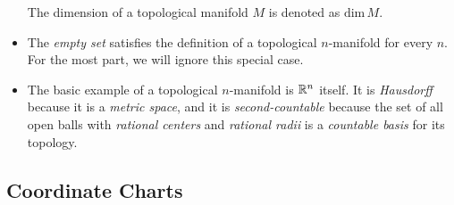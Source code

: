 \documentclass[11pt]{article}
\begin{document}
\begin{itemize}
The dimension of a topological manifold $M$ is denoted as $\text{dim}\,M$.

\item The \emph{empty set} satisfies the definition of a topological $n$-manifold for every $n$. For the most part, we will ignore this special case.

\item The basic example of a topological $n$-manifold is ${\mathbb R}^n$ itself. It is \emph{Hausdorff} because it is a \emph{metric space}, and it is \emph{second-countable} because the set of all open balls with \emph{rational centers} and \emph{rational radii} is a \emph{countable basis} for its topology.
\end{itemize}



\subsection{Coordinate Charts}
\end{document}
